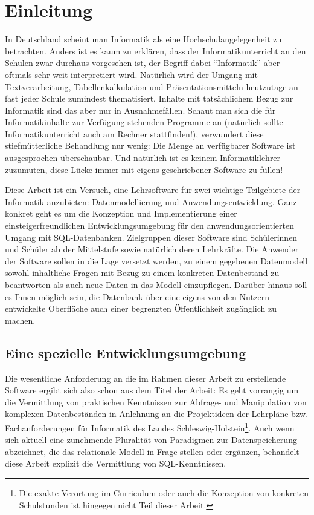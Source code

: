\section{Einleitung}

In Deutschland scheint man Informatik als eine Hochschulangelegenheit zu betrachten. Anders ist es kaum zu erklären, dass der Informatikunterricht an den Schulen zwar durchaus vorgesehen ist, der Begriff dabei ``Informatik'' aber oftmals sehr weit interpretiert wird. Natürlich wird der Umgang mit Textverarbeitung, Tabellenkalkulation und Präsentationsmitteln heutzutage an fast jeder Schule zumindest thematisiert, Inhalte mit tatsächlichem Bezug zur Informatik sind das aber nur in Ausnahmefällen. Schaut man sich die für Informatikinhalte zur Verfügung stehenden Programme an (natürlich sollte Informatikunterricht auch am Rechner stattfinden!), verwundert diese stiefmütterliche Behandlung nur wenig: Die Menge an verfügbarer Software ist ausgesprochen überschaubar. Und natürlich ist es keinem Informatiklehrer zuzumuten, diese Lücke immer mit eigens geschriebener Software zu füllen!

Diese Arbeit ist ein Versuch, eine Lehrsoftware für zwei wichtige Teilgebiete der Informatik anzubieten: Datenmodellierung und Anwendungsentwicklung. Ganz konkret geht es um die Konzeption und Implementierung einer einsteigerfreundlichen Entwicklungsumgebung für den anwendungsorientierten Umgang mit SQL-Datenbanken. Zielgruppen dieser Software sind Schülerinnen und Schüler ab der Mittelstufe sowie natürlich deren Lehrkräfte. Die Anwender der Software sollen in die Lage versetzt werden, zu einem gegebenen Datenmodell sowohl inhaltliche Fragen mit Bezug zu einem konkreten Datenbestand zu beantworten als auch neue Daten in das Modell einzupflegen. Darüber hinaus soll es Ihnen möglich sein, die Datenbank über eine eigens von den Nutzern entwickelte Oberfläche auch einer begrenzten Öffentlichkeit zugänglich zu machen.

\subsection{Eine spezielle Entwicklungsumgebung}

Die wesentliche Anforderung an die im Rahmen dieser Arbeit zu erstellende Software ergibt sich also schon aus dem Titel der Arbeit: Es geht vorrangig um die Vermittlung von praktischen Kenntnissen zur Abfrage- und Manipulation von komplexen Datenbeständen in Anlehnung an die Projektideen der Lehrpläne \cite{lehrplan-inf-sek-1} bzw. Fachanforderungen \cite{lehrplan-inf-sek-2} für Informatik des Landes Schleswig-Holstein\footnote{Die exakte Verortung im Curriculum oder auch die Konzeption von konkreten Schulstunden ist hingegen nicht Teil dieser Arbeit.}. Auch wenn sich aktuell eine zunehmende Pluralität von Paradigmen zur Datenspeicherung abzeichnet, die das relationale Modell in Frage stellen oder ergänzen, behandelt diese Arbeit explizit die Vermittlung von SQL-Kenntnissen. 

